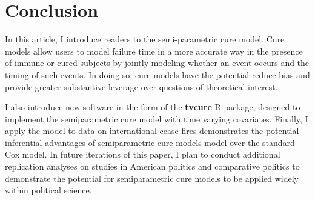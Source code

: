 \section{Conclusion}
In this article, I introduce readers to the semi-parametric cure model.%
Cure models allow users to model failure time in a more accurate way in the presence of immune or cured subjects by jointly modeling whether an event occurs and the timing of such events. In doing so, cure models have the potential reduce bias and provide greater substantive leverage over questions of theoretical interest.

I also introduce new software in the form of the \textbf{tvcure} R package, designed to implement the semiparametric cure model with time varying covariates. Finally, I apply the model to data on international cease-fires demonstrates the potential inferential advantages of semiparametric cure models model over the standard Cox model. In future iterations of this paper, I plan to conduct additional replication analyses on studies in American politics and comparative politics to demonstrate the potential for semiparametric cure models to be applied widely within political science.


